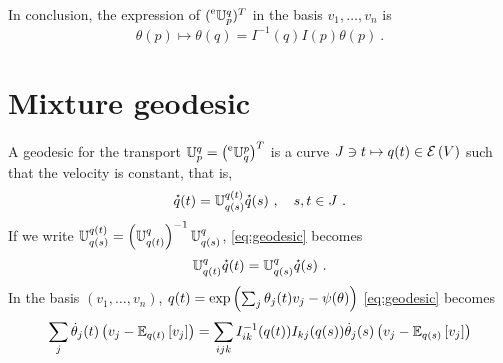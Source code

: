 \documentclass[12pt,a4paper]{amsart}
\begin{document}
In conclusion, the expression of $(\prescript{\text{e}}{} {\mathbb U} _ {p} ^ {q})^T$ in the basis $v_1,\dots,v_n$ is
\begin{equation}
  \theta(p) \mapsto \theta(q) = I^{-1}(q)I(p) \theta(p) \ .
\end{equation}

\section{Mixture geodesic}
\label{sec:mixture-geodesic}

A geodesic for the transport ${\mathbb U} _ {p} ^ {q} = \left(\prescript{\text{e}}{} {\mathbb U} _ {q} ^ {p}\right)^T$ is a curve $J \ni t \mapsto q(t) \in \operatorname{\mathcal E}\left(V\right)$ such that the velocity is constant, that is,
\begin{equation}
  \label{eq:geodesic}
  \accentset{\star}{q}(t) = {\mathbb U} _ {q(s)} ^ {q(t)} \accentset{\star}{q}(s) \ , \quad s,t \in J \ .
\end{equation}
If we write ${\mathbb U} _ {q(s)} ^ {q(t)} = \left({\mathbb U} _ {q(t)} ^ {q}\right)^{-1} {\mathbb U} _ {q(s)} ^ {q}$, 
\cref{eq:geodesic} becomes
\begin{equation}
\label{eq:geodesic-2}
{\mathbb U} _ {q(t)} ^ {q} \accentset{\star}{q}(t) = {\mathbb U} _ {q(s)} ^ {q} \accentset{\star}{q}(s) \ .    
\end{equation}
In the basis $\left(v_1,\dots,v_n\right)$, $q(t) = \exp\left(\sum_j \theta_j(t) v_j - \psi(\theta)\right)$ \cref{eq:geodesic} becomes
\begin{equation}
 \sum_j \dot \theta_j(t) \left(v_j - \operatorname{\mathbb E}_{q(t)}\left[v_j\right] \right) = \sum_{ijk} I_{ik}^{-1}(q(t)) I_{kj}(q(s)) \dot \theta_j(s) \left(v_j - \operatorname{\mathbb E}_{q(s)}\left[v_j\right]\right)  
\end{equation}

% 


\end{document}
